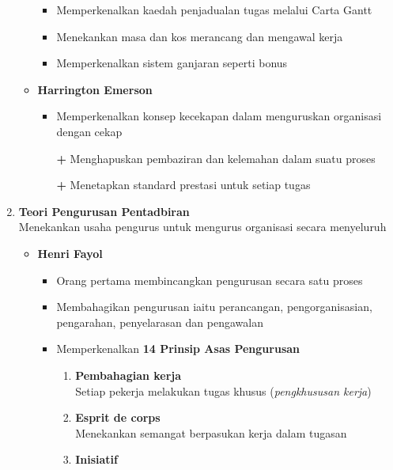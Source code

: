 \documentclass{book}
\begin{document}
\begin{multicols*}{2}
\begin{enumerate}
\begin{itemize}[leftmargin=*]
            \begin{itemize}[leftmargin=*]
              \item Memperkenalkan kaedah penjadualan tugas melalui Carta Gantt
              \item Menekankan masa dan kos merancang dan mengawal kerja
              \item Memperkenalkan sistem ganjaran seperti bonus
            \end{itemize}
          \item \textbf{Harrington Emerson}
            \begin{itemize}[leftmargin=*]
              \item Memperkenalkan konsep kecekapan dalam menguruskan organisasi dengan cekap
              \item[\textbf{+}] Menghapuskan pembaziran dan kelemahan dalam suatu proses
              \item[\textbf{+}] Menetapkan standard prestasi untuk setiap tugas
            \end{itemize}
        \end{itemize}
        \newpage
      \item \textbf{Teori Pengurusan Pentadbiran} \\ 
        Menekankan usaha pengurus untuk mengurus organisasi secara menyeluruh
        \begin{itemize}[leftmargin=*]
          \item \textbf{Henri Fayol}
            \begin{itemize}[leftmargin=*]
              \item Orang pertama membincangkan pengurusan secara satu proses
              \item Membahagikan pengurusan iaitu perancangan, pengorganisasian, pengarahan, 
                penyelarasan dan pengawalan
              \item Memperkenalkan \textbf{14 Prinsip Asas Pengurusan}
                \begin{enumerate}[label=\arabic*, leftmargin=*]
                \item \textbf{Pembahagian kerja} \\
                  Setiap pekerja melakukan tugas khusus (\textit{pengkhususan kerja})
                \item \textbf{Esprit de corps} \\
                  Menekankan semangat berpasukan kerja dalam tugasan
                \item \textbf{Inisiatif} \\

\end{enumerate}
\end{itemize}
\end{itemize}
\end{enumerate}
\end{multicols*}
\end{document}
